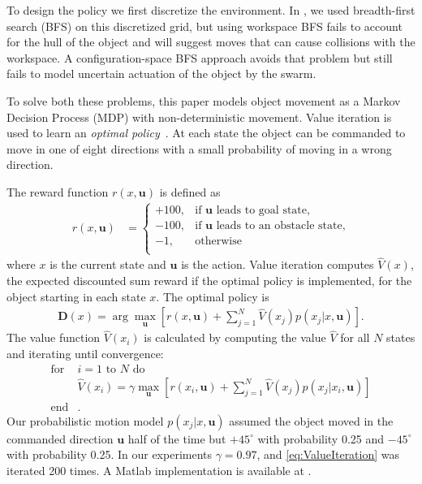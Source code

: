 To design the policy we first discretize the environment. 
In \cite{ShahrokhiIROS2015}, we used breadth-first search (BFS) on this discretized grid, but using workspace BFS fails to account for the hull of the object and will suggest moves that can cause collisions with the workspace. A configuration-space BFS approach avoids that problem but still fails to model uncertain actuation of the object by the swarm.

To solve both these problems, this paper models object movement as a Markov Decision Process (MDP) with non-deterministic movement.  
  Value iteration is used to learn an \emph{optimal policy}~\cite{Thrun2005}.
   At each state the object can be commanded to move in one of eight directions with a small probability of moving in a wrong direction. 
 
The reward function $r(x,\mathbf{u})$ is defined as
\begin{align}
r(x,\mathbf{u}) &=  \left\{
\begin{array}{ll}
     +100, &  \textrm{if } \mathbf{u} \textrm{ leads to goal state,}\\
      -100, & \textrm{if } \mathbf{u} \textrm{ leads to an obstacle state,} \\
      -1, & \textrm{otherwise}\\
\end{array} 
\right.
\end{align}
 where $x$ is the current state and $\mathbf{u}$ is the action.   %
  Value iteration computes $\hat{V}(x)$, the expected discounted sum reward if the optimal policy is implemented, for the object starting in each state $x$. The optimal policy is %
   \begin{align} \mathbf{D}(x) = \arg\max_{\mathbf{u}}  \left[ r(x,\mathbf{u}) + \sum\limits_{j=1}^N \hat{V}(x_j) p(x_j | x, \mathbf{u}) \right].  \label{eq:OptimalPolicy}
   \end{align}
   The value function $\hat{V}(x_i) $ is calculated by computing the value $\hat{V}$ for all $N$ states and iterating until convergence:
\begin{align}
\text{for }&\text{$i=1$ to $N$ do} \nonumber \\
&\hat{V} (x_i) = \gamma \max_{\mathbf{u}} \left[r(x_i,\mathbf{u}) + \sum\limits_{j=1}^N \hat{V}(x_j) p(x_j | x_i,\mathbf{u})\right] \label{eq:ValueIteration} \nonumber\\
\text{end}& \textrm{.}  %
\end{align}
Our probabilistic motion model $p(x_j | x, \mathbf{u})$ assumed the object moved in the commanded direction $\mathbf{u}$ half of the time but $+45^\circ$ with probability 0.25 and $-45^\circ$ with probability 0.25. 
In our experiments $\gamma = 0.97$, and \eqref{eq:ValueIteration} was iterated 200 times. A {\sc Matlab} implementation is available at \cite{Becker2015MDP}.


